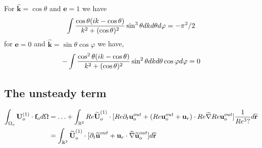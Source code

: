 For $\hat{\textbf{k}} = \cos\theta$ and $\textbf{e}=1$ we have
\begin{equation}
    \int \frac{\cos\theta (ik - \cos\theta)}{k^2 + (\cos\theta)^2}  \sin^3\theta dkd\theta d\varphi
     = - \pi^2 /2 \\
\end{equation}
for $\textbf{e}=0$ and $\hat{\textbf{k}}=\sin\theta \cos\varphi$ we have,
\begin{equation}
    -\int \frac{\cos^2\theta (ik - \cos\theta)}{k^2 + (\cos\theta)^2} \sin^2\theta   dkd\theta  \cos\varphi d\varphi
    = 0 \\
\end{equation}


\subsection{The unsteady term}
\begin{align}
    \intO[o]{\textbf{U}_{o}^{(1)}\cdot \textbf{f}_{o}}
    &=
    \ldots +  \int_{\mathbb{R}^3}Re \wt{\textbf{U}}_{o}^{(1)}\cdot [Re\pddt \textbf{u}_o^{out}+  (Re \textbf{u}_{o}^{out}+\textbf{u}_r)\cdot Re \wt{\grad}  Re\textbf{u}_{o}^{out} ]\frac{1}{Re^3 ? } d\wt{\textbf{r}}\\
    &=\int_{\mathbb{R}^3} \wt{\textbf{U}}_{o}^{(1)}\cdot  [\pddt \wt{\textbf{u}}^{out}+ \textbf{u}_r \cdot  \wt{\grad}  \wt{\textbf{u}}_{o}^{out}] d\wt{\textbf{r}}
\end{align}

